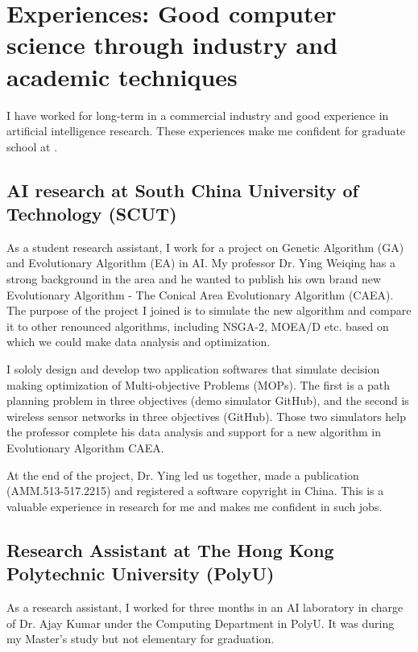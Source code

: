 \newcommand{\SCUTLong}{South China University of Technology}
\newcommand{\SCUTShort}{SCUT}
\newcommand{\PolyULong}{The Hong Kong Polytechnic University}
\newcommand{\PolyUShort}{PolyU}
\newcommand{\SGLong}{Sand Glass Information Technology Limited}
\newcommand{\SGShort}{Sand Glass Ltd.}
\newcommand{\TFSLong}{TFS Info-tech Company Limited}
\newcommand{\TFSShort}{TFS}

\section*{Experiences: Good computer science through industry and academic techniques}
I have worked for long-term in a commercial industry and good experience in artificial intelligence research. These experiences make me confident for graduate school at \schoolShort.

\subsection{AI research at {\SCUTLong} ({\SCUTShort})}
As a student research assistant, I work for a project on Genetic Algorithm (GA) and Evolutionary Algorithm (EA) in AI. My professor Dr. Ying Weiqing has a strong background in the area and he wanted to publish his own brand new Evolutionary Algorithm - The Conical Area Evolutionary Algorithm (CAEA). The purpose of the project I joined is to simulate the new algorithm and compare it to other renounced algorithms, including NSGA-2, MOEA/D etc. based on which we could make data analysis and optimization.

I sololy design and develop two application softwares that simulate decision making optimization of Multi-objective Problems (MOPs). The first is a path planning problem in three objectives (demo simulator GitHub), and the second is wireless sensor networks in three objectives (GitHub).  Those two simulators help the professor complete his data analysis and support for a new algorithm in Evolutionary Algorithm CAEA.

At the end of the project, Dr. Ying led us together, made a publication (AMM.513-517.2215) and registered a software copyright in China. This is a valuable experience in research for me and makes me confident in such jobs.



\subsection{Research Assistant at {\PolyULong} ({\PolyUShort})}
As a research assistant, I worked for three months in an AI laboratory in charge of Dr. Ajay Kumar under the Computing Department in {\PolyUShort}. It was during my Master's study but not elementary for graduation. 

